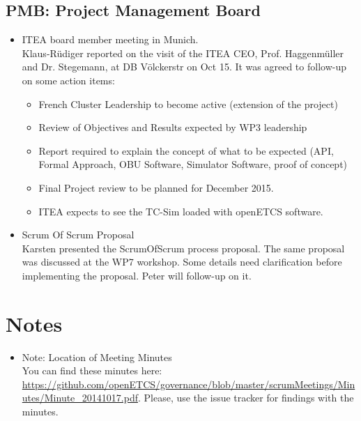 \documentclass[a4paper, 11pt]{article}
\begin{document}
\subsection{PMB: Project Management Board}
\begin{itemize}

\item ITEA board member meeting in Munich.\\
 Klaus-R\"udiger reported on the visit of the ITEA CEO, Prof. Haggenm\"uller and Dr. Stegemann,  at DB V\"olckerstr on Oct 15. It was agreed to  follow-up on some action items:\\
\begin{itemize}
\item French Cluster Leadership to become active (extension of the project)
\item Review of Objectives and Results expected by WP3 leadership
\item Report required to explain the concept of what to be expected (API, Formal Approach, OBU Software, Simulator Software, proof of concept)
\item Final Project  review to be planned for December 2015.
\item ITEA expects to see the TC-Sim loaded with openETCS software.
\end{itemize}

\item Scrum Of Scrum Proposal\\
Karsten presented the ScrumOfScrum process proposal. The same proposal was discussed at the WP7 workshop. Some details need clarification before implementing the proposal. Peter will follow-up on it.

\end{itemize}

\section{Notes}
\begin{itemize}

\item Note: Location of Meeting Minutes\\
You can find these minutes here: \url{https://github.com/openETCS/governance/blob/master/scrumMeetings/Minutes/Minute_20141017.pdf}. Please, use the issue tracker for findings with the minutes.

\end{itemize}
\end{document}
